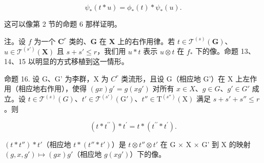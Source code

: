 \[
\psi_ {*} (t * u) = \phi_ {*} (t) * \psi_ {*} (u).
\]

这可以像第 2 节的命题 6 那样证明。

注。设 \(f\) 为一个 \(\mathbf{C}^r\) 类的、\(\mathbf{G}\) 在 \(\mathbf{X}\) 上的右作用律。若 \(t \in \mathcal{T}^{(s)}(\mathbf{G})\)、\(u \in \mathcal{T}^{(s')}(\mathbf{X})\) 且 \(s + s' \leqslant r\)，我们用 \(u * t\) 表示 \(u \otimes t\) 在 \(f_*\) 下的像。命题 13、14、15 以明显的方式移植到这一情形。

命题 16. 设 G、G' 为李群，X 为 \(C^{r}\) 类流形，且设 G（相应地 G'）在 X 上左作用（相应地右作用），使得 \((gx)g' = g(xg')\) 对所有 \(x \in X\)、\(g \in G\)、\(g' \in G'\) 成立。设 \(t \in \mathcal{T}^{(s)}(G)\)、\(t' \in \mathcal{T}^{(s')}(\mathrm{G}')\)、\(t'' \in \mathrm{T}^{(s'')}(\mathrm{X})\) 满足 \(s + s' + s'' \leqslant r\)。则

\[
(t * t ^ {\prime \prime}) * t ^ {\prime} = t * (t ^ {\prime \prime} * t ^ {\prime}).
\]

\((t*t'')*t'\)（相应地 \(t*(t''*t')\)）是 \(t\otimes t''\otimes t'\) 在 G × X × G' 到 X 的映射 \((g,x,g')\mapsto(gx)g'\)（相应地 \(g(xg')\)）下的像。

